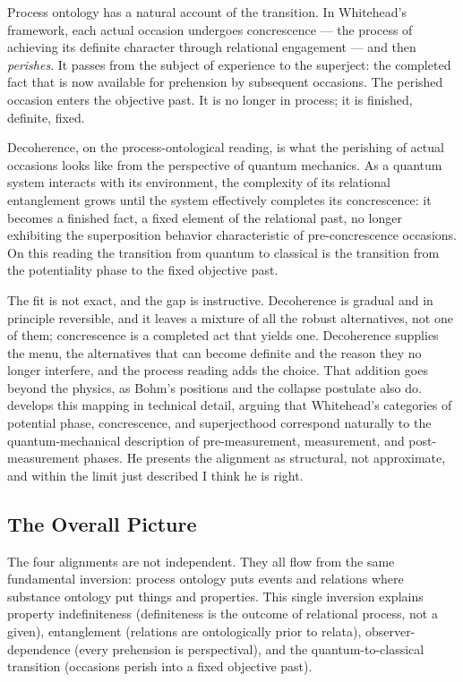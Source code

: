 Process ontology has a natural account of the transition.
In Whitehead's framework, each actual occasion undergoes concrescence --- the
process of achieving its definite character through relational engagement --- and
then \emph{perishes}.
It passes from the subject of experience to the superject: the completed fact
that is now available for prehension by subsequent occasions.
The perished occasion enters the objective past.
It is no longer in process; it is finished, definite, fixed.

Decoherence, on the process-ontological reading, is what the perishing of actual
occasions looks like from the perspective of quantum mechanics.
As a quantum system interacts with its environment, the complexity of its
relational entanglement grows until the system effectively completes its
concrescence: it becomes a finished fact, a fixed element of the relational past,
no longer exhibiting the superposition behavior characteristic of pre-concrescence
occasions.
On this reading the transition from quantum to classical is the transition from
the potentiality phase to the fixed objective past.

The fit is not exact, and the gap is instructive.
Decoherence is gradual and in principle reversible, and it leaves a mixture of
all the robust alternatives, not one of them; concrescence is a completed act
that yields one.
Decoherence supplies the menu, the alternatives that can become definite and the
reason they no longer interfere, and the process reading adds the choice.
That addition goes beyond the physics, as Bohm's positions and the collapse
postulate also do.
\citet{Epperson2004} develops this mapping in technical detail, arguing that
Whitehead's categories of potential phase, concrescence, and superjecthood
correspond naturally to the quantum-mechanical description of pre-measurement,
measurement, and post-measurement phases.
He presents the alignment as structural, not approximate, and within the limit
just described I think he is right.

\subsection*{The Overall Picture}

The four alignments are not independent.
They all flow from the same fundamental inversion: process ontology puts events
and relations where substance ontology put things and properties.
This single inversion explains property indefiniteness (definiteness is the
outcome of relational process, not a given), entanglement (relations are
ontologically prior to relata), observer-dependence (every prehension is
perspectival), and the quantum-to-classical transition (occasions perish into
a fixed objective past).

